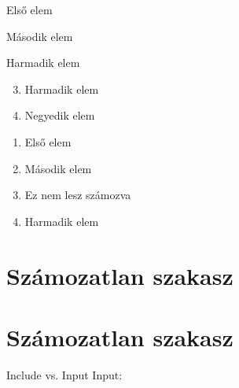 \documentclass[12pt]{book}
\begin{document}

\begin{myenum}
    \item Első elem
    \begin{myenum}
        \item Második elem
        \begin{myenum}
            \item Harmadik elem
        \end{myenum}
    \end{myenum}
\end{myenum}

\hulipsum[1]

\begin{enumerate}
    \setcounter{enumi}{2}  %
    \item Harmadik elem
    \item Negyedik elem
\end{enumerate}

\begin{enumerate}
    \item Első elem
    \item Második elem
    \item[] Ez nem lesz számozva
    \item Harmadik elem
\end{enumerate}

\section*{Számozatlan szakasz}
\label{sec:numberszakasz}

\section*{Számozatlan szakasz}
\label{sec:numberszakasz}
\hulipsum[1-10]
\newpage
\hulipsum[1-10]

Include vs. Input
Input:
\end{document}
